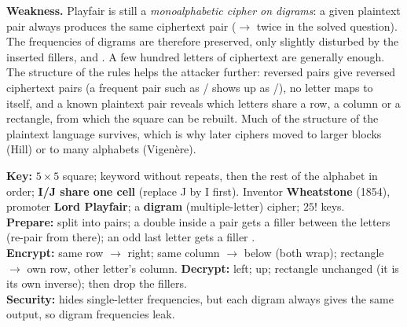 \textbf{Weakness.} Playfair is still a \emph{monoalphabetic cipher on digrams}: a given plaintext pair always produces the same ciphertext pair ($\to$ twice in the solved question). The frequencies of digrams are therefore preserved, only slightly disturbed by the inserted fillers, and . A few hundred letters of ciphertext are generally enough. The structure of the rules helps the attacker further: reversed pairs give reversed ciphertext pairs (a frequent pair such as / shows up as /), no letter maps to itself, and a known plaintext pair reveals which letters share a row, a column or a rectangle, from which the square can be rebuilt. Much of the structure of the plaintext language survives, which is why later ciphers moved to larger blocks (Hill) or to many alphabets (Vigen\`ere).

\begin{mustknow}[: Playfair]
\textbf{Key:} $5 \times 5$ square; keyword without repeats, then the rest of the alphabet in order; \textbf{I/J share one cell} (replace J by I first). Inventor \textbf{Wheatstone} (1854), promoter \textbf{Lord Playfair}; a \textbf{digram} (multiple-letter) cipher; $25!$ keys.\\
\textbf{Prepare:} split into pairs; a double inside a pair gets a filler  between the letters (re-pair from there); an odd last letter gets a filler .\\
\textbf{Encrypt:} same row $\to$ right; same column $\to$ below (both wrap); rectangle $\to$ own row, other letter's column.\quad
\textbf{Decrypt:} left; up; rectangle unchanged (it is its own inverse); then drop the fillers.\\
\textbf{Security:} hides single-letter frequencies, but each digram always gives the same output, so digram frequencies leak.
\end{mustknow}

